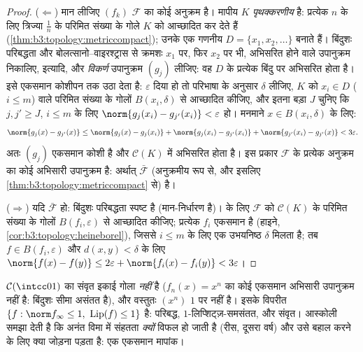 \begin{proof}
($\Leftarrow$) मान लीजिए $(f_k)$ $\mathcal F$ का कोई अनुक्रम है।  मापीय
$K$ \emph{पृथक्करणीय} है: प्रत्येक $n$ के लिए त्रिज्या $\frac1n$
के परिमित संख्या के गोले $K$ को आच्छादित कर देते हैं (\cref{thm:b3:topology:metriccompact});
उनके  एक गणनीय  $D = \{x_1, x_2, \dots\}$ बनाते हैं। बिंदुशः
परिबद्धता और बोलत्सानो--वाइरश्ट्रास से क्रमशः $x_1$ पर, फिर
$x_2$ पर भी, अभिसरित होने वाले उपानुक्रम निकालिए, इत्यादि, और
\emph{विकर्ण} उपानुक्रम $(g_j)$ लीजिए: वह $D$ के प्रत्येक बिंदु
पर अभिसरित होता है।  इसे एकसमान कोशीपन तक उठा देता है:
$\varepsilon$ दिया हो तो परिभाषा के अनुसार $\delta$ लीजिए, $K$ को $x_i \in D$
($i \leq m$) वाले परिमित संख्या के गोलों $B(x_i, \delta)$ से आच्छादित कीजिए, और
इतना बड़ा $J$ चुनिए कि $j, j' \geq
J$, $i \leq m$ के लिए $\norm{g_j(x_i) - g_{j'}(x_i)} < \varepsilon$ हो। मनमाने
$x \in B(x_i, \delta)$ के लिए:
\[
\norm{g_j(x) - g_{j'}(x)}
\leq \norm{g_j(x) - g_j(x_i)} + \norm{g_j(x_i) - g_{j'}(x_i)}
+ \norm{g_{j'}(x_i) - g_{j'}(x)} < 3\varepsilon .
\]
अतः $(g_j)$ एकसमान कोशी है और  $\mathcal C(K)$ में अभिसरित होता है। इस
प्रकार $\mathcal F$ के प्रत्येक अनुक्रम का कोई अभिसारी उपानुक्रम है:
अर्थात् $\bar{\mathcal F}$ (अनुक्रमीय रूप से, और इसलिए \cref{thm:b3:topology:metriccompact} से)  है।

($\Rightarrow$) यदि $\bar{\mathcal F}$  हो: बिंदुशः परिबद्धता स्पष्ट है
(मान-निर्धारण  है)।  के लिए $\mathcal F$ को $\mathcal C(K)$ के परिमित
संख्या के गोलों $B(f_i, \varepsilon)$ से आच्छादित कीजिए; प्रत्येक $f_i$ एकसमान
 है (हाइने, \cref{cor:b3:topology:heineborel}), जिससे $i \leq m$ के लिए एक उभयनिष्ठ $\delta$
मिलता है; तब $f \in B(f_i, \varepsilon)$ और $d(x,y)
< \delta$ के लिए $\norm{f(x)-f(y)} \leq 2\varepsilon +
\norm{f_i(x)-f_i(y)} < 3\varepsilon$।
\end{proof}

\begin{example}\label{ex:b3:complete:ascoliexamples}
$\mathcal C(\intcc01)$ का संवृत इकाई गोला  \emph{नहीं} है ($f_n(x) = x^n$ का कोई
एकसमान अभिसारी उपानुक्रम नहीं है: बिंदुशः सीमा असंतत है), और
वस्तुतः $(x^n)$ $1$ पर  नहीं है। इसके विपरीत $\{f : \norm
f_\infty \leq 1,\ \operatorname{Lip}(f) \leq 1\}$ 
है: परिबद्ध, $1$-लिप्शिट्ज़-समसंतत, और संवृत। आस्कोली समझा देती
है कि अनंत विमा में संहतता \emph{क्यों} विफल हो जाती है (रीस,
दूसरा वर्ष) और उसे बहाल करने के लिए क्या जोड़ना पड़ता है: एक
एकसमान  मापांक।
\end{example}

